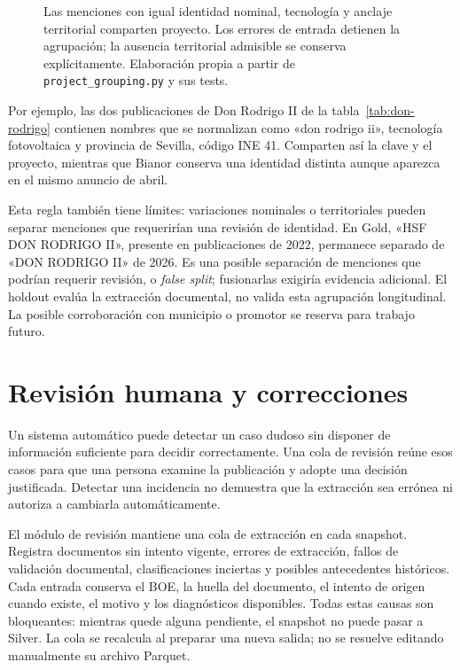 \begin{figure}[p]
\centering

\caption[Agrupación de menciones en proyectos]{Las menciones con igual
identidad nominal, tecnología y anclaje territorial comparten proyecto.
Los errores de entrada detienen la agrupación; la ausencia territorial
admisible se conserva explícitamente. Elaboración propia a partir de
\texttt{project\_grouping.py} y sus tests.}
\label{fig:grouping-implementado}
\end{figure}

Por ejemplo, las dos publicaciones de Don Rodrigo II de la
tabla~\ref{tab:don-rodrigo} contienen nombres que se normalizan como
«don rodrigo ii», tecnología fotovoltaica y provincia de Sevilla, código INE
41. Comparten así la clave y el proyecto, mientras que Bianor conserva una
identidad distinta aunque aparezca en el mismo anuncio de abril.

Esta regla también tiene límites: variaciones nominales o territoriales
pueden separar menciones que requerirían una revisión de identidad. En Gold,
«HSF DON RODRIGO II», presente en publicaciones de 2022, permanece separado de
«DON RODRIGO II» de 2026. Es una posible separación de menciones que podrían requerir revisión, o
\emph{false split}; fusionarlas exigiría evidencia adicional. El holdout evalúa
la extracción documental, no valida esta agrupación longitudinal. La posible corroboración con municipio o promotor se reserva para
trabajo futuro.

\section{Revisión humana y correcciones}

\label{sec:revision-humana}
Un sistema automático puede detectar un caso dudoso sin disponer de
información suficiente para decidir correctamente. Una cola de revisión
reúne esos casos para que una persona examine la publicación y adopte una
decisión justificada. Detectar una incidencia no demuestra que la extracción
sea errónea ni autoriza a cambiarla automáticamente.

El módulo de revisión mantiene una cola de extracción en cada snapshot. Registra
documentos sin intento vigente, errores de extracción, fallos de validación
documental, clasificaciones inciertas y posibles antecedentes históricos.
Cada entrada conserva el BOE, la huella del documento, el intento de origen
cuando existe, el motivo y los diagnósticos disponibles. Todas estas causas
son bloqueantes: mientras quede alguna pendiente, el snapshot no puede
pasar a Silver. La cola se recalcula al preparar una nueva salida; no se
resuelve editando manualmente su archivo Parquet.

